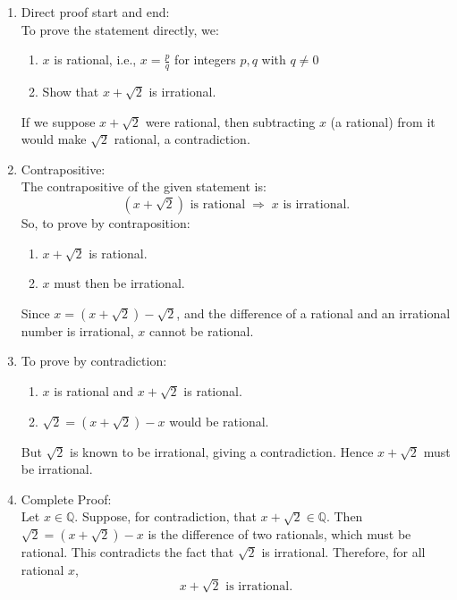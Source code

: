 \documentclass[twoside]{article}
\begin{document}
\begin{enumerate}
    \item[(a)] Direct proof start and end: \\
               To prove the statement directly, we: 
               \begin{enumerate}
                \item[(i)]  \(x\) is rational, i.e., \(x = \frac{p}{q}\) for integers \(p, q\) with \(q \neq 0\)
                \item[(ii)]  Show that \(x + \sqrt{2}\) is irrational.
               \end{enumerate}
               If we suppose \(x + \sqrt{2}\) were rational, then subtracting \(x\) (a rational) from it would make \(\sqrt{2}\) rational, a contradiction.
    
    \item [(b)] Contrapositive: \\
                The contrapositive of the given statement is:
                \[(x + \sqrt{2}) \text{ is rational} \;\Rightarrow\; x \text{ is irrational.}\]
                So, to prove by contraposition:
                \begin{enumerate}
                    \item {} \(x + \sqrt{2}\) is rational.
                    \item {} \(x\) must then be irrational.
                \end{enumerate}
                Since \(x = (x + \sqrt{2}) - \sqrt{2}\), and the difference of a rational and an irrational number is irrational, \(x\) cannot be rational.

    \item [(c)] To prove by contradiction: 
                \begin{enumerate}
                    \item {} \(x\) is rational and \(x + \sqrt{2}\) is rational.
                    \item {} \(\sqrt{2} = (x + \sqrt{2}) - x\) would be rational.
                \end{enumerate}
                But \(\sqrt{2}\) is known to be irrational, giving a contradiction. Hence \(x + \sqrt{2}\) must be irrational.

    \item [(d)] Complete Proof: \\
                Let \(x \in \mathbb{Q}\). Suppose, for contradiction, that \(x + \sqrt{2} \in \mathbb{Q}\).
                Then \(\sqrt{2} = (x + \sqrt{2}) - x\) is the difference of two rationals, which must be rational.
                This contradicts the fact that \(\sqrt{2}\) is irrational. Therefore, for all rational \(x\),
                \[x + \sqrt{2} \text{ is irrational.}\]


\end{enumerate}
\end{document}
